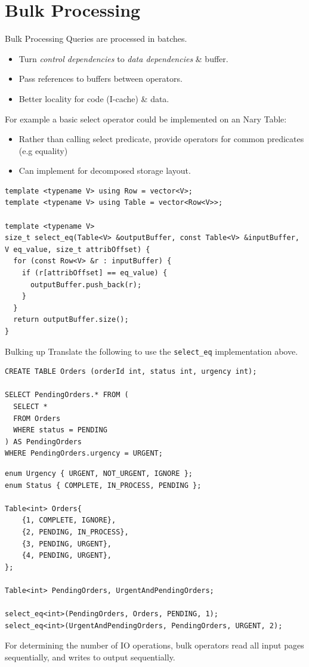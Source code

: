 \section{Bulk Processing}
\begin{definitionbox}{Bulk Processing}
  Queries are processed in batches.
  \begin{itemize}
    \item Turn \textit{control dependencies} to \textit{data dependencies} \& buffer.
    \item Pass references to buffers between operators.
    \item Better locality for code (I-cache) \& data.
  \end{itemize}
\end{definitionbox}
For example a basic select operator could be implemented on an Nary Table:
\begin{itemize}
  \item Rather than calling select predicate, provide operators for common predicates (e.g equality)
  \item Can implement for decomposed storage layout.
\end{itemize}
\begin{verbatim}
template <typename V> using Row = vector<V>;
template <typename V> using Table = vector<Row<V>>;

template <typename V>
size_t select_eq(Table<V> &outputBuffer, const Table<V> &inputBuffer, V eq_value, size_t attribOffset) {
  for (const Row<V> &r : inputBuffer) {
    if (r[attribOffset] == eq_value) {
      outputBuffer.push_back(r);
    }
  }
  return outputBuffer.size();
}
\end{verbatim}
\begin{examplebox}{Bulking up}
  Translate the following to use the \texttt{select_eq} implementation above.
  \begin{verbatim}
CREATE TABLE Orders (orderId int, status int, urgency int);

SELECT PendingOrders.* FROM (
  SELECT *
  FROM Orders
  WHERE status = PENDING
) AS PendingOrders
WHERE PendingOrders.urgency = URGENT;
  \end{verbatim}
  \tcblower
  \begin{verbatim}
enum Urgency { URGENT, NOT_URGENT, IGNORE };
enum Status { COMPLETE, IN_PROCESS, PENDING };

Table<int> Orders{
    {1, COMPLETE, IGNORE},
    {2, PENDING, IN_PROCESS},
    {3, PENDING, URGENT},
    {4, PENDING, URGENT},
};

Table<int> PendingOrders, UrgentAndPendingOrders;

select_eq<int>(PendingOrders, Orders, PENDING, 1);
select_eq<int>(UrgentAndPendingOrders, PendingOrders, URGENT, 2);
  \end{verbatim}
\end{examplebox}
\noindent
For determining the number of IO operations, bulk operators read all input pages sequentially, and writes to output sequentially.


